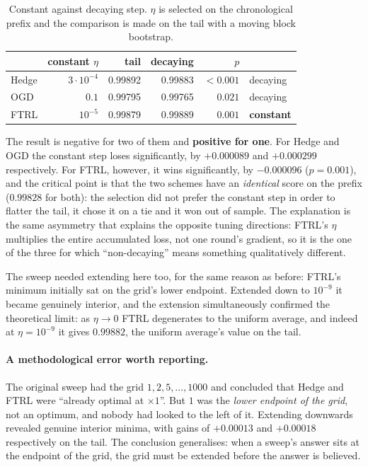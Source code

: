 \documentclass[12pt,a4paper,oneside]{report}
\renewcommand{\_}{\oldunderscore\allowbreak}
\theoremstyle{definition}
\theoremstyle{plain}
\theoremstyle{remark}
\begin{document}
\begin{table}[H]
\centering
\begin{tabular}{@{}lrrrrl@{}}
\toprule
& \textbf{constant $\eta$} & \textbf{tail} & \textbf{decaying} & \textbf{$p$} & \\
\midrule
Hedge & $3\cdot10^{-4}$ & 0.99892 & 0.99883 & $<0.001$ & decaying \\
OGD   & $0.1$           & 0.99795 & 0.99765 & $0.021$  & decaying \\
FTRL  & $10^{-5}$       & 0.99879 & 0.99889 & $0.001$  & \textbf{constant} \\
\bottomrule
\end{tabular}
\caption{Constant against decaying step. $\eta$ is selected on the chronological prefix and the
comparison is made on the tail with a moving block bootstrap.}
\label{tab:const-step}
\end{table}

The result is negative for two of them and \textbf{positive for one}. For Hedge and OGD the
constant step loses significantly, by $+0.000089$ and $+0.000299$ respectively. For FTRL, however,
it wins significantly, by $-0.000096$ ($p=0.001$), and the critical point is that the two
schemes have an \emph{identical} score on the prefix ($0.99828$ for both): the selection did
not prefer the constant step in order to flatter the tail, it chose it on a tie and it won out
of sample. The explanation is the same asymmetry that explains the opposite tuning directions:
FTRL's $\eta$ multiplies the entire accumulated loss, not one round's gradient, so it is the
one of the three for which ``non-decaying'' means something qualitatively different.

The sweep needed extending here too, for the same reason as before: FTRL's minimum initially sat
on the grid's lower endpoint. Extended down to $10^{-9}$ it became genuinely interior, and the
extension simultaneously confirmed the theoretical limit: as $\eta \to 0$ FTRL degenerates to the
uniform average, and indeed at $\eta=10^{-9}$ it gives $0.99882$, the uniform average's value on
the tail.

\paragraph{A methodological error worth reporting.} The original sweep had the grid
$1, 2, 5, \dots, 1000$ and concluded that Hedge and FTRL were ``already optimal at $\times 1$''.
But $1$ was the \emph{lower endpoint of the grid}, not an optimum, and nobody had looked to the
left of it. Extending downwards revealed genuine interior minima, with gains of $+0.00013$ and
$+0.00018$ respectively on the tail. The conclusion generalises: when a sweep's answer sits at the
endpoint of the grid, the grid must be extended before the answer is believed.
\end{document}
